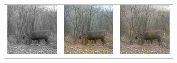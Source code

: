 \documentclass[a4paper,11pt, DIV=12]{scrartcl}
\begin{document}
\begin{figure}[ht]
\begin{subfigure}{0.63\textwidth}
\begin{tabularx}{1\textwidth}{>{\centering\arraybackslash}X >{\centering\arraybackslash}X >{\centering\arraybackslash}X}
         \includegraphics{58ac0e4c-23d2-11e8-a6a3-ec086b02610b_real.png} & \includegraphics{58ac0e4c-23d2-11e8-a6a3-ec086b02610b_cycle_gan.png} & \includegraphics{58ac0e4c-23d2-11e8-a6a3-ec086b02610b_cut.png} \\

\end{tabularx}
\end{subfigure}
\end{figure}
\end{document}
